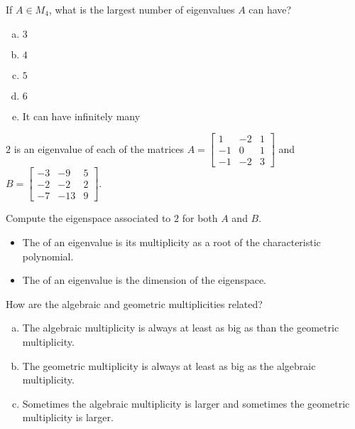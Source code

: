 
\begin{applicationActivities}{4}{28}

\begin{activity}{5}
  If $A \in M_4$, what is the largest number of eigenvalues $A$ can have?
  \begin{enumerate}[(a)]
  \item $3$
  \item $4$
  \item $5$
  \item $6$
  \item It can have infinitely many
  \end{enumerate}
\end{activity}

\begin{activity}{10}
  $2$ is an eigenvalue of each of the matrices $A=\begin{bmatrix} 1 & -2 & 1 \\ -1 & 0 & 1 \\ -1 & -2 & 3\end{bmatrix}$ and $B=\begin{bmatrix} -3 & -9 & 5 \\ -2 & -2 & 2 \\ -7 & -13 & 9 \end{bmatrix}$.

  Compute the eigenspace associated to $2$ for both $A$ and $B$.
\end{activity}

\begin{definition}

\begin{itemize}
\item The  of an eigenvalue is its multiplicity as a root of the characteristic polynomial.
\item The  of an eigenvalue is the dimension of the eigenspace.
\end{itemize}

\end{definition}

\begin{activity}{10} How are the algebraic and geometric multiplicities related?
\begin{enumerate}[(a)]
\item The algebraic multiplicity is always at least as big as than the geometric multiplicity.
\item The geometric multiplicity is always at least as big as the algebraic multiplicity.
\item Sometimes the algebraic multiplicity is larger and sometimes the geometric multiplicity is larger.
\end{enumerate}
\end{activity}


\end{applicationActivities}

